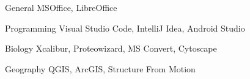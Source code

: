 

\begin{cvpairs}

  
\cvpair
    {General} %
    {MSOffice, LibreOffice} %

  
\cvpair
    {Programming} %
    {Visual Studio Code, IntelliJ Idea, Android Studio} %

  
\cvpair
    {Biology} %
    {Xcalibur, Proteowizard, MS Convert, Cytoscape} %

  
\cvpair
    {Geography} %
    {QGIS, ArcGIS, Structure From Motion} %

\end{cvpairs}